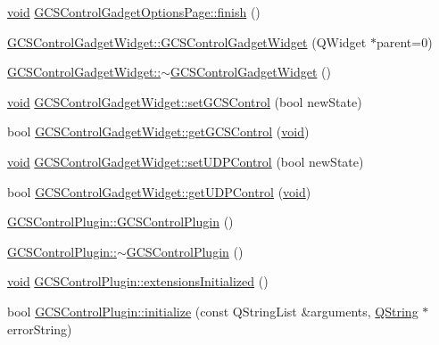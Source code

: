 \begin{DoxyCompactItemize}
\item 
\hyperlink{group___u_a_v_objects_plugin_ga444cf2ff3f0ecbe028adce838d373f5c}{void} \hyperlink{group___g_c_s_control_gadget_plugin_ga99dea02a466b40903d82ed298e62a038}{G\-C\-S\-Control\-Gadget\-Options\-Page\-::finish} ()
\item 
\hyperlink{group___g_c_s_control_gadget_plugin_ga631488a05f2911312aa2701deafc099e}{G\-C\-S\-Control\-Gadget\-Widget\-::\-G\-C\-S\-Control\-Gadget\-Widget} (Q\-Widget $\ast$parent=0)
\item 
\hyperlink{group___g_c_s_control_gadget_plugin_gac531923c2dca3888a8ff072acf4949f6}{G\-C\-S\-Control\-Gadget\-Widget\-::$\sim$\-G\-C\-S\-Control\-Gadget\-Widget} ()
\item 
\hyperlink{group___u_a_v_objects_plugin_ga444cf2ff3f0ecbe028adce838d373f5c}{void} \hyperlink{group___g_c_s_control_gadget_plugin_gaa7bf374aeebdf1e677885605644c508c}{G\-C\-S\-Control\-Gadget\-Widget\-::set\-G\-C\-S\-Control} (bool new\-State)
\item 
bool \hyperlink{group___g_c_s_control_gadget_plugin_ga4802bb05a27e5b7b98fba727aa298cbf}{G\-C\-S\-Control\-Gadget\-Widget\-::get\-G\-C\-S\-Control} (\hyperlink{group___u_a_v_objects_plugin_ga444cf2ff3f0ecbe028adce838d373f5c}{void})
\item 
\hyperlink{group___u_a_v_objects_plugin_ga444cf2ff3f0ecbe028adce838d373f5c}{void} \hyperlink{group___g_c_s_control_gadget_plugin_ga8e3fea7e5b4e9a7811faccbbe646ad37}{G\-C\-S\-Control\-Gadget\-Widget\-::set\-U\-D\-P\-Control} (bool new\-State)
\item 
bool \hyperlink{group___g_c_s_control_gadget_plugin_ga0354d422f9780a2e5fb610c0decf3e13}{G\-C\-S\-Control\-Gadget\-Widget\-::get\-U\-D\-P\-Control} (\hyperlink{group___u_a_v_objects_plugin_ga444cf2ff3f0ecbe028adce838d373f5c}{void})
\item 
\hyperlink{group___g_c_s_control_gadget_plugin_gaa5bf178769d6fdc89db0176db639c02a}{G\-C\-S\-Control\-Plugin\-::\-G\-C\-S\-Control\-Plugin} ()
\item 
\hyperlink{group___g_c_s_control_gadget_plugin_gaa8f4c5803ed27c6a490522181ad40efa}{G\-C\-S\-Control\-Plugin\-::$\sim$\-G\-C\-S\-Control\-Plugin} ()
\item 
\hyperlink{group___u_a_v_objects_plugin_ga444cf2ff3f0ecbe028adce838d373f5c}{void} \hyperlink{group___g_c_s_control_gadget_plugin_gad526ae3249e30303394221453d4483a2}{G\-C\-S\-Control\-Plugin\-::extensions\-Initialized} ()
\item 
bool \hyperlink{group___g_c_s_control_gadget_plugin_ga57b8a6ede4344b5a2e3e9460b158dde8}{G\-C\-S\-Control\-Plugin\-::initialize} (const Q\-String\-List \&arguments, \hyperlink{group___u_a_v_objects_plugin_gab9d252f49c333c94a72f97ce3105a32d}{Q\-String} $\ast$error\-String)

\end{DoxyCompactItemize}
